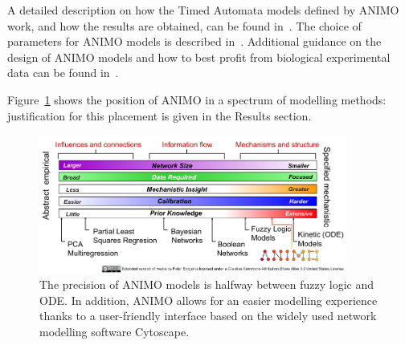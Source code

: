 \documentclass{bmcart}
\begin{document}
A detailed description on how the Timed Automata models defined by ANIMO work, and how the results are obtained,
can be found in~\cite{animo-ieee}. The choice of parameters for ANIMO models is described in~\cite{animo-syncop}.
Additional guidance on the design of ANIMO models and how to best profit from biological experimental data can be found in~\cite{animo-gene}.

Figure~\ref{fig:animo-spectrum} shows the position of ANIMO in a spectrum of modelling methods: justification for this placement is given in the Results section.



\begin{figure}[htbp]
 \begin{center}
  \includegraphics[width=0.9\textwidth]{Figures/2}
 \end{center}
\caption{
The precision of ANIMO models is halfway between fuzzy logic and ODE. In addition, ANIMO
allows for an easier modelling experience thanks to a user-friendly interface based on
the widely used network modelling software Cytoscape.\label{fig:animo-spectrum}}
\end{figure}
\end{document}
